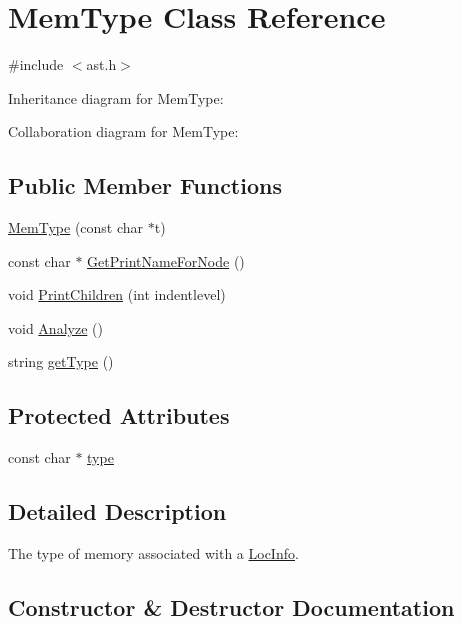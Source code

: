 \hypertarget{class_mem_type}{}\section{Mem\+Type Class Reference}
\label{class_mem_type}


{\ttfamily \#include $<$ast.\+h$>$}



Inheritance diagram for Mem\+Type\+:


Collaboration diagram for Mem\+Type\+:
\subsection*{Public Member Functions}
\begin{DoxyCompactItemize}
\item 
\hyperlink{class_mem_type_abfa3afb25f010c3a1815996705f44729}{Mem\+Type} (const char $\ast$t)
\item 
const char $\ast$ \hyperlink{class_mem_type_a9ffea7894f0e757aab866a467b0ae563}{Get\+Print\+Name\+For\+Node} ()
\item 
void \hyperlink{class_mem_type_a98f3fd7954d2edaaa2f809cb2889e420}{Print\+Children} (int indentlevel)
\item 
void \hyperlink{class_mem_type_a40773866273e8e3321c67d1bfaab14da}{Analyze} ()
\item 
string \hyperlink{class_mem_type_aa7003b89f89d3faa43e6eeaa3116d544}{get\+Type} ()
\end{DoxyCompactItemize}
\subsection*{Protected Attributes}
\begin{DoxyCompactItemize}
\item 
const char $\ast$ \hyperlink{class_mem_type_abf81810db8d14176f971fb6d6c5f510d}{type}
\end{DoxyCompactItemize}


\subsection{Detailed Description}
The type of memory associated with a \hyperlink{class_loc_info}{Loc\+Info}. 

\subsection{Constructor \& Destructor Documentation}
\mbox{\label{class_mem_type_abfa3afb25f010c3a1815996705f44729}} 
